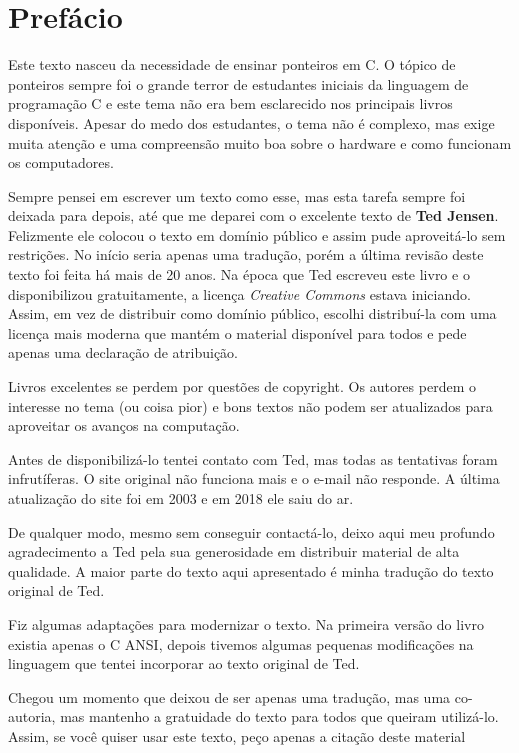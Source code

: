 
\chapter*{Prefácio}
Este texto nasceu da necessidade de ensinar ponteiros em C. O tópico de ponteiros sempre foi o grande terror de estudantes iniciais da linguagem de programação C e este tema não era bem esclarecido nos principais livros disponíveis. Apesar do medo dos estudantes, o tema não é complexo, mas exige muita atenção e uma compreensão muito boa sobre o hardware e como funcionam os computadores.

Sempre pensei em escrever um texto como esse, mas esta tarefa sempre foi deixada para depois, até que me deparei com o excelente texto de \textbf{Ted Jensen}. Felizmente ele colocou o texto em domínio público e assim pude aproveitá-lo sem restrições. No início seria apenas uma tradução, porém a última revisão deste texto foi feita há mais de 20 anos. Na época que Ted escreveu este livro e o disponibilizou gratuitamente, a licença \textit{Creative Commons }estava iniciando. Assim, em vez de distribuir como domínio público, escolhi distribuí-la com uma licença mais moderna que mantém o material disponível para todos e pede apenas uma declaração de atribuição.

Livros excelentes se perdem por questões de copyright. Os autores perdem o interesse no tema (ou coisa pior) e bons textos não podem ser atualizados para aproveitar os avanços na computação.

Antes de disponibilizá-lo tentei contato com Ted, mas todas as tentativas foram infrutíferas. O site original não funciona mais e o e-mail não responde. A última atualização do site foi em 2003 e em 2018 ele saiu do ar.

De qualquer modo, mesmo sem conseguir contactá-lo, deixo aqui meu profundo agradecimento a Ted pela sua generosidade em distribuir material de alta qualidade. A maior parte do texto aqui apresentado é minha tradução do texto original de Ted.

Fiz algumas adaptações para modernizar o texto. Na primeira versão do livro existia apenas o C ANSI, depois tivemos algumas pequenas modificações na linguagem que tentei incorporar ao texto original de Ted. 

Chegou um momento que deixou de ser apenas uma tradução, mas uma co-autoria, mas mantenho a gratuidade do texto para todos que queiram utilizá-lo. Assim, se você quiser usar este texto, peço apenas a citação deste material

